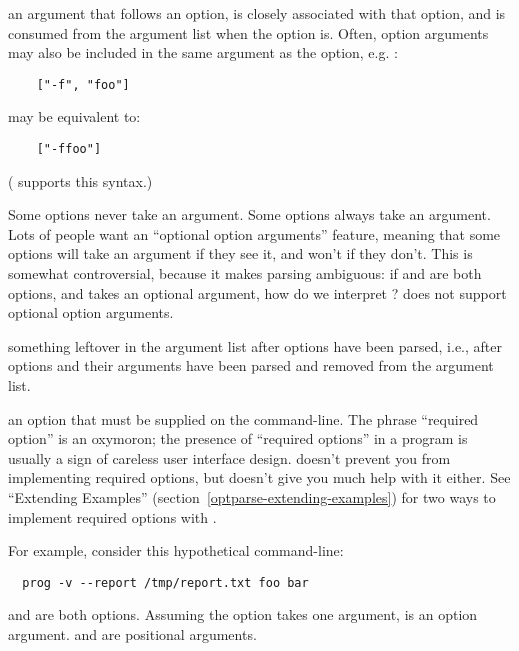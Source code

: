 \begin{definitions}
an argument that follows an option, is closely associated with that
option, and is consumed from the argument list when the option is.
Often, option arguments may also be included in the same argument as
the option, e.g. :

\begin{verbatim}
    ["-f", "foo"]
\end{verbatim}

may be equivalent to:

\begin{verbatim}
    ["-ffoo"]
\end{verbatim}

( supports this syntax.)

Some options never take an argument.  Some options always take an
argument.  Lots of people want an ``optional option arguments'' feature,
meaning that some options will take an argument if they see it, and
won't if they don't.  This is somewhat controversial, because it makes
parsing ambiguous: if  and  are both
options, and  takes an optional argument, how do we
interpret ?   does not support optional
option arguments.

something leftover in the argument list after options have been
parsed, i.e., after options and their arguments have been parsed and
removed from the argument list.

an option that must be supplied on the command-line.  The phrase
``required option'' is an oxymoron; the presence of ``required options''
in a program is usually a sign of careless user interface design.
 doesn't prevent you from implementing required
options, but doesn't give you much help with it either.  See ``Extending
Examples'' (section~\ref{optparse-extending-examples}) for two ways to
implement required options with .

\end{definitions}

For example, consider this hypothetical command-line:

\begin{verbatim}
  prog -v --report /tmp/report.txt foo bar
\end{verbatim}

 and  are both options.  Assuming
the  option takes one argument,
 is an option argument.   and 
are positional arguments.

